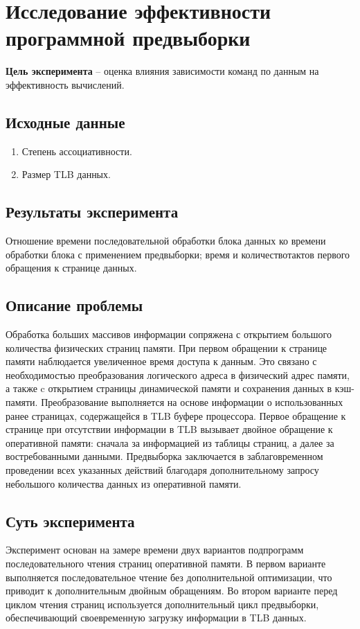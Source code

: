 \section{Исследование эффективности программной предвыборки}

\textbf{Цель эксперимента} -- оценка   влияния   зависимости   команд   по   данным   на эффективность вычислений.

\subsection{Исходные данные}
\begin{enumerate}
	\item Степень ассоциативности.
	\item Размер TLB данных.
\end{enumerate}

\subsection{Результаты эксперимента}
Отношение времени последовательной обработки блока данных ко времени обработки блока с применением предвыборки; время и количествотактов первого обращения к странице  данных.


\subsection{Описание проблемы}
Обработка больших массивов информации сопряжена с открытием большого количества физических страниц памяти.  При первом обращении к странице памяти наблюдается   увеличенное время доступа к данным. Это связано с необходимостью преобразования логического адреса в физический адрес памяти, а также c открытием   страницы   динамической   памяти   и   сохранения   данных   в   кэш-памяти. Преобразование выполняется на основе информации о использованных ранее страницах, содержащейся в TLB буфере процессора. Первое обращение к странице при отсутствии информации   в  TLB  вызывает двойное обращение к оперативной памяти: сначала за информацией из таблицы страниц, а далее за востребованными данными.   Предвыборка заключается   в   заблаговременном   проведении   всех   указанных   действий   благодаря дополнительному запросу небольшого количества данных из оперативной памяти.

\subsection{Суть эксперимента}  
Эксперимент основан на замере времени двух вариантов подпрограмм последовательного чтения страниц оперативной памяти. В первом варианте выполняется последовательное чтение без дополнительной оптимизации, что приводит к дополнительным двойным обращениям. Во втором варианте перед циклом чтения страниц используется   дополнительный   цикл   предвыборки,   обеспечивающий   своевременную загрузку информации в TLB данных. 


